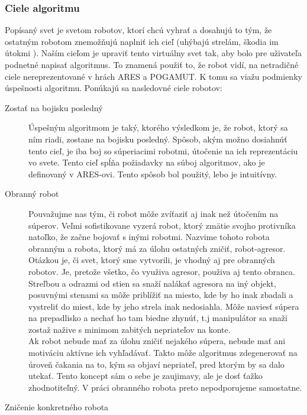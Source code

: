 \subsubsection{Ciele algoritmu}
Popísaný svet je svetom robotov, ktorí  chcú vyhrať a dosahujú to tým, že ostatným robotom znemožňujú naplniť ich cieľ (uhýbajú strelám, škodia im útokmi ). Naším cieľom je upraviť tento virtuálny svet tak, aby bolo pre uživateľa podnetné napisať algoritmus. To znamená použiť to, že robot vidí, na netradičné ciele nereprezentované v hrách ARES a POGAMUT. K tomu sa viažu podmienky úspešnosti algoritmu. 
Ponúkajú sa nasledovné ciele robotov:
\begin{description}
\item [Zostať na bojisku posledný] \hfill \newline
Úspešným algoritmom je taký, ktorého výsledkom je, že robot, ktorý sa ním riadi, zostane na bojisku posledný. Spôsob, akým možno dosiahnúť tento cieľ, je iba boj so súperiacimi robotmi, útočenie na ich reprezentáciu vo svete. Tento cieľ spĺňa požiadavky na súboj algoritmov, ako je definovaný v ARES-ovi. Tento spôsob bol použitý, lebo je intuitívny.
\item [Obranný robot] \hfill \newline %
Pouvažujme nas tým, či robot môže zvíťaziť aj inak než útočením na súperov. Veľmi sofistikovane vyzerá robot, ktorý zmätie svojho protivníka natoľko, že začne bojovať s inými robotmi. Nazvime tohoto robota obranným a robota, ktorý má za úlohu ostatných zničiť, robot-agresor.\\
Otázkou je, či svet, ktorý sme vytvorili, je vhodný aj pre obranných robotov. Je, pretože všetko, čo využiva agresor, použiva aj tento obranca. Streľbou a odrazmi od stien sa snaží nalákať agresora na iný objekt, posuvnými stenami sa môže priblížiť na miesto, kde by ho inak zbadali a vystreliť do miest, kde by jeho strela inak nedosiahla. Môže naviesť súpera na prepadlisko a nechať ho tam biedne zhynúť, t.j manipulátor sa snaži zostaž nažive s minimom zabitých nepriateľov na konte.\\ %
Ak robot nebude mať za úlohu zničiť nejakého súpera, nebude mať ani motiváciu aktívne ich vyhľadávať. Takto môže algoritmus zdegenerovať na úroveň čakania na to, kým sa objaví nepriateľ, pred ktorým by sa dalo utekať. Tento koncept sám o sebe je zaujimavy, ale je dosť ťažko zhodnotiteľný. V práci obranného robota preto nepodporujeme samostatne.
\item [Zničenie konkretného robota] \hfill \newline

\end{description}
